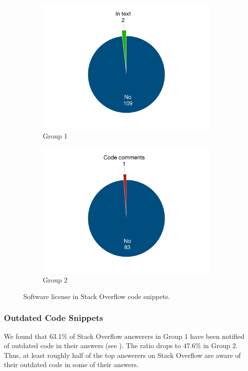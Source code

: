 \documentclass[10pt,journal,compsoc]{IEEEtran}
\begin{document}
\begin{figure}
	\begin{subfigure}{.25\textwidth}
		\centering
		\includegraphics[width=.6\linewidth]{survey_license_1}
		\caption{Group 1}
		\label{fig:survey_license_1}
	\end{subfigure}%
	\begin{subfigure}{.25\textwidth}
		\centering
		\includegraphics[width=.6\linewidth]{survey_license_2}
		\caption{Group 2}
		\label{fig:survey_license_2}
	\end{subfigure}
	\caption{Software license in Stack Overflow code snippets.}
	\label{fig:survey_license}
\end{figure}

\subsubsection{Outdated Code Snippets} 

We found that 63.1\% of Stack Overflow answerers in Group 1 have been notified of
outdated code in their answers (see ). The ratio drops to 47.6\% in
Group 2. Thus, at least roughly half of the top answerers on Stack Overflow
are aware of their outdated code in some of their answers.
\end{document}
